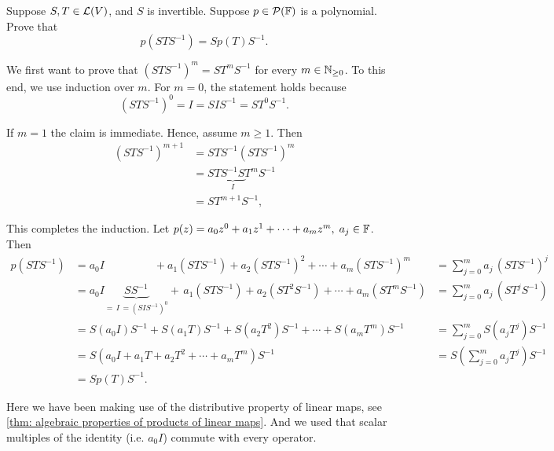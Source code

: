 \begin{xrcs}
  Suppose $S,T \in \mathcal{L} (V)$, and $S$ is invertible. Suppose $p \in \mathcal{P}(\mathbb{F})$ is a polynomial. Prove that
  \begin{equation}
    p(STS^{-1}) = S p(T) S ^{-1}.
  \end{equation}

  \begin{xprf}
    We first want to prove that $(STS^{-1})^m = ST^m S^{-1}$ for every $m \in \mathbb{N}_{\geq 0}$. To this end, we use induction over $m$. For $m=0$, the statement holds because
    \begin{equation}
      (STS^{-1})^0 = I = SIS^{-1} = ST^0S^{-1}.
    \end{equation}

    If $m=1$ the claim is immediate. Hence, assume $m \geq 1$. Then
    \begin{equation}
      \begin{aligned}
        (STS^{-1})^{m+1} &= STS^{-1} (STS^{-1}) ^m \\
          &= ST\underbrace{S^{-1} S}_{I}T^m S^{-1} \\
          &= S T^{m+1} S^{-1},
      \end{aligned}
    \end{equation}

    This completes the induction. Let $p(z)=a_0 z^0 + a_1 z^1 + \cdots + a_m z^m, \; a_j \in \mathbb{F}$. Then
    \begin{equation}
      \begin{aligned}
        p(STS^{-1})
          &= a_0 I \phantom{ A A A A A A  } + a_1(STS^{-1}) + a_2 (STS^{-1})^2 + \cdots + a_m (STS^{-1})^m
            & = \textstyle \sum_{j=0}^m a_j\,(STS^{-1})^j \\
          &= a_0 I \underbrace{S S^{-1} }_{= \, I \, = (SIS^{-1})^0} + \, a_1(STS^{-1}) + a_2 (ST^2S^{-1}) + \cdots + a_m (ST^mS^{-1})
            & = \textstyle \sum_{j=0}^m a_j\,(ST^jS^{-1}) \\
          &= S (a_0 I)  S^{-1} + S(a_1T)S^{-1} + S(a_2 T^2)S^{-1} + \cdots + S(a_mT^m)S^{-1}
            & = \textstyle \sum_{j=0}^m S(a_jT^j)S^{-1}\\
          &= S \left( a_0 I  + a_1T + a_2 T^2 + \cdots + a_mT^m \right)S^{-1}
            & = S \left(\textstyle \sum_{j=0}^m a_jT^j\right) S^{-1} \\
          &= S p(T) S^{-1}.
      \end{aligned}
    \end{equation}

    Here we have been making use of the distributive property of linear maps, see  \ref{thm: algebraic properties of products of linear maps}. And we used that scalar multiples of the identity (i.e. $a_0 I$) commute with every operator.
  \end{xprf}
\end{xrcs}

